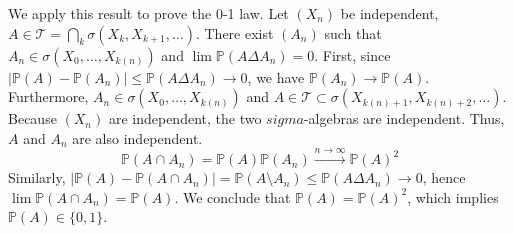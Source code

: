 We apply this result to prove the 0-1 law. Let $(X_n)$ be independent, $A \in \mathcal{T} = \bigcap_k \sigma(X_k, X_{k+1}, \dots)$.
There exist $(A_n)$ such that $A_n \in \sigma(X_0, \dots, X_{k(n)})$ and $\lim \mathbb{P}(A \Delta A_n) = 0$.
First, since $|\mathbb{P}(A) - \mathbb{P}(A_n)| \le \mathbb{P}(A \Delta A_n) \to 0$, we have $\mathbb{P}(A_n) \to \mathbb{P}(A)$.
Furthermore, $A_n \in \sigma(X_0, \dots, X_{k(n)})$ and $A \in \mathcal{T} \subset \sigma(X_{k(n)+1}, X_{k(n)+2}, \dots)$.
Because $(X_n)$ are independent, the two $sigma$-algebras are independent. Thus, $A$ and $A_n$ are also independent.
\[ \mathbb{P}(A \cap A_n) = \mathbb{P}(A) \mathbb{P}(A_n) \xrightarrow{n \to \infty} \mathbb{P}(A)^2 \]%
Similarly, $|\mathbb{P}(A) - \mathbb{P}(A \cap A_n)| = \mathbb{P}(A \setminus A_n) \le \mathbb{P}(A \Delta A_n) \to 0$, hence $\lim \mathbb{P}(A \cap A_n) = \mathbb{P}(A)$.
We conclude that $\mathbb{P}(A) = \mathbb{P}(A)^2$, which implies $\mathbb{P}(A) \in \{0,1\}$.%
